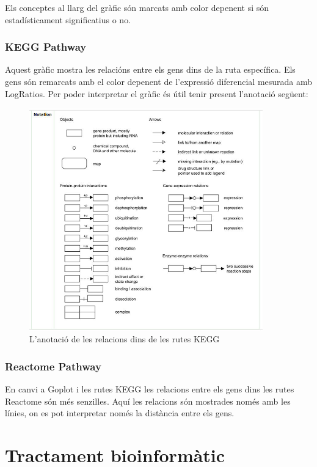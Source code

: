 Els conceptes al llarg del gràfic són marcats amb color depenent si són estadísticament significatius o no.

\subsection{KEGG Pathway}
Aquest gràfic mostra les relacións entre els gens dins de la ruta específica. Els gens són remarcats amb el color depenent de l'expressió diferencial mesurada amb LogRatios. Per poder interpretar el gràfic és útil tenir present l'anotació següent:

\begin{figure}[H]
\centering
\includegraphics[width=0.9\textwidth]{Annotation_KEGG.jpg} 
\caption{L'anotació de les relacions dins de les rutes KEGG}
\end{figure}

\subsection{Reactome Pathway}
En canvi a Goplot i les rutes KEGG les relacions entre els gens dins les rutes Reactome són més senzilles. Aquí les relacions són mostrades només amb les línies, on es pot interpretar només la distància entre els gens. 

\chapter{Tractament bioinformàtic}

